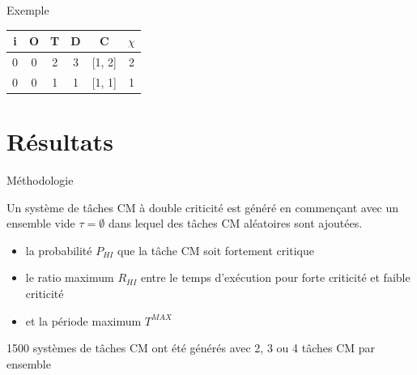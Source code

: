 \documentclass{bredelebeamer}
\begin{document}
\begin{frame}{Exemple}
\centering
\begin{tabular}{|c|c|c|c|c|c|}
\hline
i &O & T & D & C & $\chi$\\
\hline
0 & 0 & 2 & 3 & [1, 2]& 2\\
\hline
0 & 0 & 1 & 1 & [1, 1]& 1\\
\hline
\end{tabular}
\begin{figure}[h]
\centering
    \resizebox{\textwidth-2cm}{!}{
    \fontsize{28pt}{12pt}\selectfont

}
\label{idle:exem:fail}

\end{figure} 
\end{frame}

\section{Résultats}


\begin{frame}{Méthodologie}
\begin{block}{}

Un système de tâches CM à double criticité est généré en commençant avec un ensemble vide $\tau = \emptyset$ dans lequel des tâches CM aléatoires sont ajoutées.
\begin{itemize}
\item la probabilité $P_{HI}$ que la tâche CM soit fortement critique
\item le ratio maximum $R_{HI}$ entre le temps d'exécution pour forte criticité et faible criticité
\item et la période maximum $T^{MAX}$
\end{itemize}

\end{block}

1500 systèmes de tâches CM ont été générés avec 2, 3 ou 4 tâches CM par ensemble


\end{frame}
\end{document}
